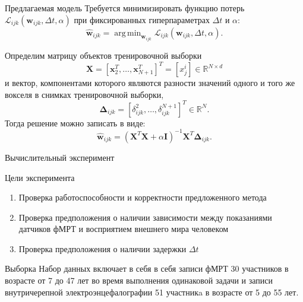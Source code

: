 \documentclass[9pt,pdf]{beamer} %
\DeclareMathOperator*{\argmin}{arg\,min}  %
\begin{document}
\begin{frame}{Предлагаемая модель}
Требуется минимизировать функцию потерь $\mathcal{L}_{ijk}(\bm{w}_{ijk}, \Delta t, \alpha)$ при фиксированных гиперпараметрах $\Delta t$ и $\alpha$:
\begin{equation*}
	\label{main_Problem}
	\hat{\bm{w}}_{ijk} = \argmin_{\bm{w}_{ijk}} \mathcal{L}_{ijk}(\bm{w}_{ijk}, \Delta t, \alpha).
\end{equation*}

Определим матрицу объектов тренировочной выборки
\begin{equation*}
\label{X}
    \bm{X} = [\bm{x}_2^T, \dots, \bm{x}_{N+1}^T]^T = [x^i_j] \in \mathbb{R}^{N \times d}
\end{equation*}
и вектор, компонентами которого являются разности значений одного и того же вокселя в снимках тренировочной выборки,
\begin{equation*}
\label{Delta}
    \bm{\Delta}_{ijk} = [\delta^{2}_{ijk}, \dots, \delta^{N+1}_{ijk}]^T \in \mathbb{R}^{N}.
\end{equation*}
Тогда решение можно записать в виде:
\begin{equation*}
\label{weights}
    \hat{\bm{w}}_{ijk} = (\bm{X}^T \bm{X} + \alpha \mathbf{I})^{-1} \bm{X}^T \bm{\Delta}_{ijk}.
\end{equation*}

\end{frame}
\begin{frame}{Вычислительный эксперимент}
\begin{block}{Цели эксперимента}
\begin{enumerate}
    \item Проверка работоспособности и корректности предложенного метода
    \item Проверка предположения о наличии зависимости между показаниями датчиков фМРТ и восприятием внешнего мира человеком
    \item Проверка предположения о наличии задержки $\Delta t$
\end{enumerate}
\end{block}
\begin{block}{Выборка} 
Набор данных включает в себя в себя записи фМРТ 30 участников в возрасте от 7 до 47 лет во время выполнения одинаковой задачи и записи внутричерепной электроэнцефалографии 51 участникa в возрасте от 5 до 55 лет. 
\end{block}

\end{frame}
\end{document}

